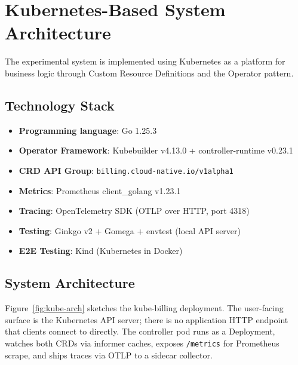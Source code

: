 \section{Kubernetes-Based System Architecture}

The experimental system is implemented using Kubernetes as a platform for business logic through Custom Resource Definitions and the Operator pattern.

\subsection{Technology Stack}

\begin{itemize}
    \item \textbf{Programming language}: Go 1.25.3
    \item \textbf{Operator Framework}: Kubebuilder v4.13.0 + controller-runtime v0.23.1
    \item \textbf{CRD API Group}: \texttt{billing.cloud-native.io/v1alpha1}
    \item \textbf{Metrics}: Prometheus client\_golang v1.23.1
    \item \textbf{Tracing}: OpenTelemetry SDK (OTLP over HTTP, port 4318)
    \item \textbf{Testing}: Ginkgo v2 + Gomega + envtest (local API server)
    \item \textbf{E2E Testing}: Kind (Kubernetes in Docker)
\end{itemize}

\subsection{System Architecture}

Figure~\ref{fig:kube-arch} sketches the kube-billing deployment. The user-facing surface is the Kubernetes API server; there is no application HTTP endpoint that clients connect to directly. The controller pod runs as a Deployment, watches both CRDs via informer caches, exposes \texttt{/metrics} for Prometheus scrape, and ships traces via OTLP to a sidecar collector.


